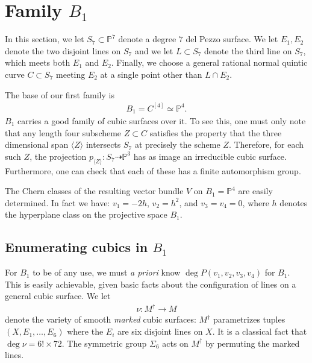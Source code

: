 \documentclass{article}
\renewcommand{\P}{\mathbb{P}}
\newcommand{\<}{\left\langle}
\renewcommand{\>}{\right\rangle}
\begin{document}
\section{Family $B_1$}
\label{sec:first-test-family}

In this section, we let $S_7 \subset \P^7$ denote a degree $7$ del
Pezzo surface. We let $E_{1}, E_{2}$ denote the two disjoint lines on
$S_{7}$ and we let $L \subset S_{7}$ denote the third line on $S_{7}$,
which meets both $E_{1}$ and $E_{2}$. Finally, we choose a general
rational normal quintic curve $C \subset S_{7}$ meeting $E_{2}$ at a
single point other than $L \cap E_{2}$.

The base of our first family is
\begin{align}
  \label{eq:B1}
  B_1 = C^{[4]} \simeq \P^{4}.
\end{align}
 $B_1$ carries a good family of cubic surfaces over it.
To see this, one must only note that any length four subscheme
$Z \subset C$ satisfies the property that the three dimensional span
$\langle Z \rangle$ intersects $S_7$ at precisely the scheme
$Z$. Therefore, for each such $Z$, the projection
$p_{\langle Z \rangle}: S_7 \dashrightarrow \P^{3}$ has as image an
irreducible cubic surface.  Furthermore, one can check that each of
these has a finite automorphism group.

The Chern classes of the resulting vector bundle $V$ on
$B_{1} = \P^{4}$ are easily determined. In fact we have:
$v_{1} = -2h$, $v_{2}=h^2$, and $v_{3}= v_{4}=0$, where $h$ denotes
the hyperplane class on the projective space $B_1$.

\subsection{Enumerating cubics in $B_1$}
\label{sec:enum-cubics-b_1}


For $B_1$ to be of any use, we must {\sl a priori} know
$\deg P(v_{1},v_{2},v_{3},v_{4})$ for $B_1$. This is easily
achievable, given basic facts about the configuration of lines on a
general cubic surface. We let
\begin{align}
  \label{eq:nu}
  \nu: M^{\dagger} \to M
  \end{align}
  denote the variety of smooth {\sl marked} cubic surfaces:
  $M^{\dagger}$ parametrizes tuples $(X, E_{1}, \dots, E_{6})$ where
  the $E_{i}$ are six disjoint lines on $X$. It is a classical fact
  that $\deg \nu = 6! \times 72$. The symmetric group $\Sigma_6$ acts
  on $M^{\dagger}$ by permuting the marked lines.
\end{document}
